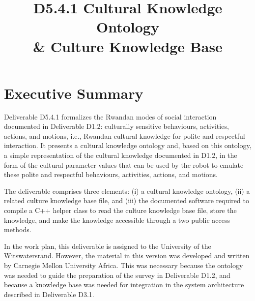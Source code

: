 \documentclass{CSSRforAfrica}
\begin{document}



\title{D5.4.1  Cultural Knowledge Ontology \\ \& Culture Knowledge Base}   





\maketitle
 

\section*{Executive Summary}
\label{executive_summary}
 
Deliverable D5.4.1  formalizes the Rwandan modes of social interaction documented in Deliverable D1.2:  culturally sensitive behaviours, activities, actions, and motions, i.e., Rwandan cultural knowledge for polite and respectful interaction. It presents  a cultural knowledge ontology and, based on this ontology, a simple representation of the cultural knowledge documented in D1.2,  in the form of the cultural parameter values that can be used by the robot to emulate these polite and respectful behaviours, activities, actions, and motions.

The deliverable comprises three elements: (i) a cultural knowledge ontology, (ii) a related culture knowledge base file, and (iii)  the documented software required to compile a C++ helper class to read the culture knowledge base file, store the knowledge, and make the knowledge accessible through a two public access methods. 

In the work plan, this deliverable is assigned to the University of the Witswatersrand. However, the material in this  version was developed and written by Carnegie Mellon University Africa. This was necessary because the ontology was needed to guide the preparation of the survey in Deliverable D1.2, and because a knowledge base was needed for integration in the system architecture described in Deliverable D3.1.
  
\end{document}
